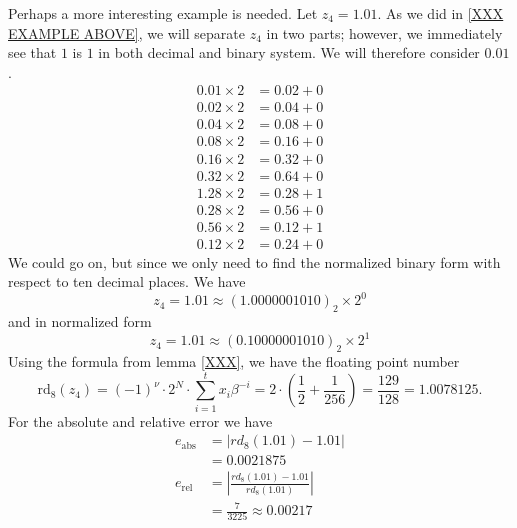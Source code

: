 \begin{exmp}
    Perhaps a more interesting example is needed. Let \(z_4 = 1.01\). As we did in \ref{XXX EXAMPLE ABOVE}, we will separate \(z_4\) in two parts; however, we immediately see that \(1\) is \(1\) in both decimal and binary system. We will therefore consider \(0.01\).
    \begin{align*}
        0.01 \times 2 &= 0.02 + 0 \\
        0.02 \times 2 &= 0.04 + 0 \\
        0.04 \times 2 &= 0.08 + 0 \\
        0.08 \times 2 &= 0.16 + 0 \\
        0.16 \times 2 &= 0.32 + 0 \\
        0.32 \times 2 &= 0.64 + 0 \\
        1.28 \times 2 &= 0.28 + 1 \\
        0.28 \times 2 &= 0.56 + 0 \\
        0.56 \times 2 &= 0.12 + 1 \\
        0.12 \times 2 &= 0.24 + 0
    \end{align*}
    We could go on, but since we only need to find the normalized binary form with respect to ten decimal places. We have
    \begin{equation*}
        z_4 = 1.01 \approx (1.0000001010)_2 \times 2^0
    \end{equation*}
    and in normalized form
    \begin{equation*}
        z_4 = 1.01 \approx (0.10000001010)_2 \times 2^1
    \end{equation*}
    Using the formula from lemma \ref{XXX}, we have the floating point number
    \begin{equation*}
        \text{rd}_8(z_4) = (-1)^{\nu} \cdot 2^N \cdot \sum_{i=1}^{t}x_i \beta^{-i} = 2 \cdot \left(\frac{1}{2} + \frac{1}{256}\right) = \frac{129}{128} = 1.0078125 \text{.}
    \end{equation*}
    For the absolute and relative error we have
    \begin{align*}
        e_\text{abs} &= \left| {rd}_8(1.01) - 1.01 \right| \\
        &= 0.0021875 \\
        e_\text{rel} &= \left| \frac{{rd}_8(1.01) - 1.01}{{rd}_8(1.01)} \right| \\
        &= \frac{7}{3225} \approx 0.00217
    \end{align*}
\end{exmp}
%
%
